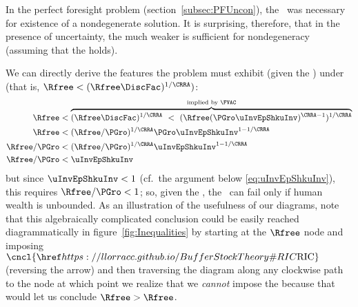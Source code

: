 \documentclass[BufferStockTheory]{subfiles}
\begin{document}
In the perfect foresight problem
(section~\ref{subsec:PFUncon}), the \RIC~was necessary for existence of
a nondegenerate solution.  It is surprising, therefore, that in the presence of uncertainty, the much weaker {\WRIC} is sufficient for nondegeneracy (assuming that the {\FVAC} holds).
\begin{comment}
  But if the \RIC~does hold, some useful results can be derived.  Arguably
  the most fundamental are that the limiting values
  for the minimal and maximal marginal propensities to consume implicit in
  \eqref{eq:MaxMPCInv} and \eqref{eq:MinMPCInv} are positive and finite.
\end{comment}
We can directly derive the features the problem must
exhibit (given the \FVAC) under \cncl{\RIC} (that is, $\Rfree < (\Rfree \DiscFac)^{1/\CRRA})$:
\begin{align}
  \Rfree   & < \overbrace{(\Rfree \DiscFac)^{1/\CRRA} ~ < ~ (\Rfree (\PGro \uInvEpShkuInv)^{\CRRA-1})^{1/\CRRA}}^{\text{implied by \FVAC}} \notag
  \\  \Rfree   & < (\Rfree/\PGro)^{1/\CRRA}\PGro \uInvEpShkuInv^{1-1/\CRRA} \notag
  \\  \Rfree/\PGro  & < (\Rfree/\PGro)^{1/\CRRA}\uInvEpShkuInv^{1-1/\CRRA} \notag
  \\  \Rfree/\PGro  & < \uInvEpShkuInv \label{eq:RICimplies}
\end{align}
but since $\uInvEpShkuInv < 1$ (cf.\ the argument below \eqref{eq:uInvEpShkuInv}), this requires $\Rfree/\PGro < 1$; so, given the \FVAC, the \RIC~can fail only if human wealth is unbounded.  As an illustration of the usefulness of our diagrams, note that this algebraically complicated conclusion could be easily reached diagrammatically in figure~\ref{fig:Inequalities} by starting at the $\Rfree$ node and imposing $\cncl{\RIC}$ (reversing the {\RIC} arrow) and then traversing the diagram along any clockwise path to the {\PFVAF} node at which point we realize that we \textit{cannot} impose the {\FHWC} because that would let us conclude $\Rfree > \Rfree$.
\end{document}
